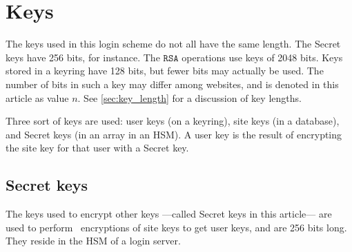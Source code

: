 %
%
%
\section{Keys}
The keys used in this login scheme do not all have the same length.
The Secret keys have 256 bits, for instance.
The $\mathtt{RSA}$ operations use keys of 2048 bits.
Keys stored in a keyring have 128 bits,
but fewer bits may actually be used.
The number of bits in such a key may differ among websites,
and is denoted in this article as value $n$.
See \vref{sec:key_length} for a discussion of key lengths.
\par
Three sort of keys are used:
user keys
(on a keyring),
site keys
(in a database),
and Secret keys
(in an array in an HSM).
A user key is the result of encrypting the site key for that user with a Secret key.

\subsection{Secret keys}
\label{sec:secret_keys}
The keys used to encrypt other keys%
---called Secret keys in this article---%
are used to perform \AES\ encryptions of site keys to get user keys,
and are 256 bits long.
They reside in the HSM of a login server.
